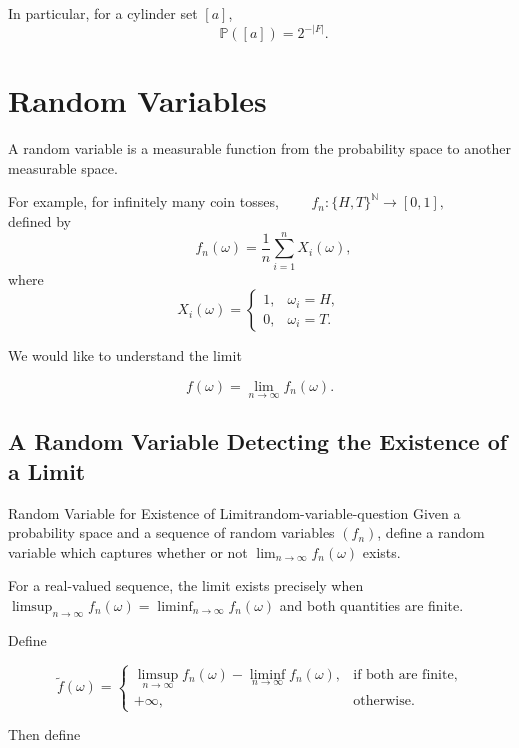 In particular, for a cylinder set $[a]$,
\[\qquad
\mathbb{P}([a])
=
2^{-|F|}.
\]


\section{Random Variables}

A random variable is a measurable function from the probability space
to another measurable space.

For example, for infinitely many coin tosses,
\(\qquad
f_n:
\{H,T\}^{\mathbb{N}}
\longrightarrow
[0,1],
\)
~~~ 
defined by
\[\qquad
f_n(\omega)
=
\frac{1}{n}
\sum_{i=1}^{n}X_i(\omega),
\]
where
\[
X_i(\omega)
=
\begin{cases}
1, & \omega_i=H,\\
0, & \omega_i=T.
\end{cases}
\]

We would like to understand the limit

\[
f(\omega)
=
\lim_{n\to\infty}f_n(\omega).
\]

\subsection{A Random Variable Detecting the Existence of a Limit}

\begin{question}{Random Variable for Existence of Limit}{random-variable-question}
Given a probability space and a sequence of random variables
$(f_n)$, define a random variable which captures whether or not
\(
\lim_{n\to\infty}f_n(\omega)
\)
exists.
\end{question}

For a real-valued sequence, the limit exists precisely when
\(
\limsup_{n\to\infty}f_n(\omega)
=
\liminf_{n\to\infty}f_n(\omega)
\)
and both quantities are finite.

Define

\[
\widetilde f(\omega)
=
\begin{cases}
\displaystyle
\limsup_{n\to\infty}f_n(\omega)
-
\liminf_{n\to\infty}f_n(\omega),
&
\text{if both are finite},\\[2ex]
+\infty,
&
\text{otherwise}.
\end{cases}
\]

Then define

